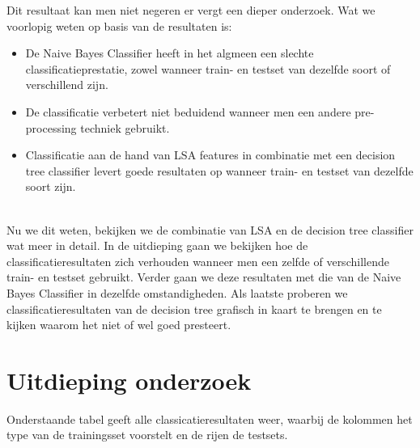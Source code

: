 Dit resultaat kan men niet negeren er vergt een dieper onderzoek. Wat we  voorlopig weten op basis van de resultaten is:
%
\begin{itemize}
  \item De Naive Bayes Classifier heeft in het algmeen een slechte classificatieprestatie, zowel wanneer train- en testset van dezelfde soort of verschillend zijn.
  \item De classificatie verbetert niet beduidend wanneer men een andere pre-processing techniek gebruikt.
  \item Classificatie aan de hand van LSA features in combinatie met een decision tree classifier levert goede resultaten op wanneer train- en testset van dezelfde soort zijn.
\end{itemize}
\\
Nu we dit weten, bekijken we de combinatie van LSA en de decision tree classifier wat meer in detail. In de uitdieping gaan we bekijken hoe de classificatieresultaten zich verhouden wanneer men een zelfde of verschillende train- en testset gebruikt. Verder gaan we deze resultaten met die van de Naive Bayes Classifier in dezelfde omstandigheden. Als laatste proberen we classificatieresultaten van de decision tree grafisch in kaart te brengen en te kijken waarom het niet of wel goed presteert.   


\section{Uitdieping onderzoek}\label{Deel 2}

Onderstaande tabel geeft alle classicatieresultaten weer, waarbij de kolommen het type van de trainingsset voorstelt en de rijen de testsets.

